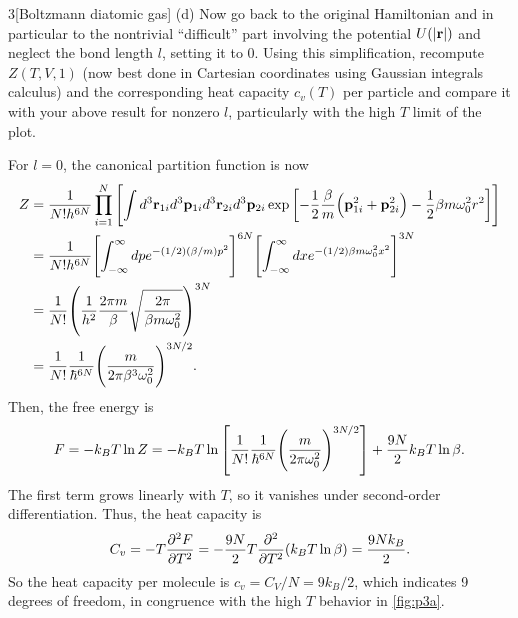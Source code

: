 \documentclass[12pt]{article}
\begin{document}
\begin{problem}{3}[Boltzmann diatomic gas]
(d) Now go back to the original Hamiltonian and in particular to the nontrivial
``difficult'' part involving the potential $U(\abs{\vb{r}})$ and neglect the
bond length $l$, setting it to 0. Using this simplification, recompute
$Z(T,V,1)$ (now best done in Cartesian coordinates using Gaussian integrals
calculus) and the corresponding heat capacity $c_v(T)$ per particle and compare
it with your above result for nonzero $l$, particularly with the high $T$ limit
of the plot.
\begin{solution}
For $l=0$, the canonical partition 
function is now
\begin{align}
Z&=\frac1{N!h^{6N}}\prod_{i=1}^N\qty[\int d^3\vb{r}_{1i} d^3\vb{p}_{1i}
d^3\vb{r}_{2i}d^3\vb{p}_{2i}\exp\qty[-\frac12\frac{\beta}{m}\qty(\vb{p}_{1i}^2+\vb{p}_{2i}^2)-\frac12\beta
m\omega_0^2r^2]]\notag\\
 &=\frac1{N!h^{6N}}\qty[\int_{-\infty}^\infty dp e^{-(1/2)(\beta/m)p^2}]^{6N}
 \qty[\int_{-\infty}^\infty dx e^{-(1/2)\beta m\omega_0^2x^2}]^{3N}\notag\\
 &=\frac1{N!}\qty(\frac1{h^2}\frac{2\pi
 m}{\beta}\sqrt{\frac{2\pi}{\beta m\omega_0^2}})^{3N}\notag\\
 &=\frac1{N!}\frac1{\hbar^{6N}}\qty(\frac{m}{2\pi\beta^3\omega_0^2})^{3N/2}.
\end{align}
Then, the free energy is
\begin{equation}
    F=-k_BT\ln Z
    =-k_BT\ln\qty[\frac1{N!}\frac1{\hbar^{6N}}\qty(\frac{m}{2\pi\omega_0^2})^{3N/2}]
    +\frac{9N}{2}k_BT\ln\beta.
\end{equation}
The first term grows linearly with $T$, so it vanishes under second-order
differentiation. Thus, the heat capacity is
\begin{equation}
    C_v=-T\frac{\partial^2F}{\partial T^2}
    =-\frac{9N}{2}T\frac{\partial^2}{\partial T^2}\qty(k_BT\ln\beta)
    =\frac{9Nk_B}{2}.
\end{equation}
So the heat capacity per molecule is $c_v=C_V/N=9k_B/2$, which indicates 9
degrees of freedom, in congruence with the high $T$ behavior in \cref{fig:p3a}.
\end{solution}
\end{problem}
\newpage
\end{document}
